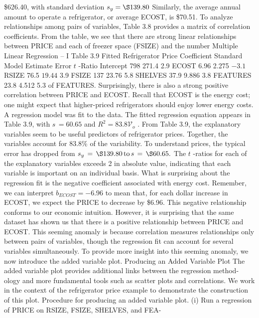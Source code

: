 \documentclass[11pt]{article}
\begin{document}
\$626.40, with standard deviation \(s_{y}=\S1 3 9 . 8 0\) Similarly, the average annual
amount to operate a refrigerator, or average ECOST, is \$70.51.
 To analyze relationships among pairs of variables, Table 3.8 provides a matrix
of correlation coefficients. From the table, we see that there are strong linear
relationships between PRICE and each of freezer space (FSIZE) and the number
 Multiple Linear Regression -- I
Table 3.9 Fitted
Refrigerator Price Coefficient Standard
 Model Estimate Error \(t\) -Ratio
Intercept 798 271.4 2.9
ECOST 6.96 2.275 \(- 3 . 1\)
RSIZE 76.5 \(1 9 . 4 4\) 3.9
FSIZE 137 23.76 5.8
SHELVES 37.9 9.886 3.8
FEATURES 23.8 4.512 5.3
 of FEATURES. Surprisingly, there is also a strong positive correlation between
PRICE and ECOST. Recall that ECOST is the energy cost; one might expect that 
 higher-priced refrigerators should enjoy lower energy costs.
 A regression model was fit to the data. The fitted regression equation appears
 in Table 3.9, with \(s \,=6 0 . 6 5\) and \(R^{2}=8 3 . 8 \mathcal{V}_{o}\) .
From Table 3.9, the explanatory variables seem to be useful predictors of
refrigerator prices. Together, the variables account for 83.8\% of the variability. To
 understand prices, the typical error has dropped from \(s_{y} \,=\, \S1 3 9 . 8 0 \, \mathrm{t o} \, s \,=\, \S6 0 . 6 5 .\)
The \(t\) -ratios for each of the explanatory variables exceeds 2 in absolute value,
 indicating that each variable is important on an individual basis.
What is surprising about the regression fit is the negative coefficient associated
with energy cost. Remember, we can interpret \(b_{E C O S T}=-6 . 9 6\) to mean that, for
each dollar increase in ECOST, we expect the PRICE to decrease by \$6.96. This
 negative relationship conforms to our economic intuition. However, it is surprising
that the same dataset has shown us that there is a positive relationship between
PRICE and ECOST. This seeming anomaly is because correlation measures
relationships only between pairs of variables, though the regression fit can account
for several variables simultaneously. To provide more insight into this seeming
 anomaly, we now introduce the added variable plot.
 Producing an Added Variable Plot
 The added variable plot provides additional links between the regression method-
 ology and more fundamental tools such as scatter plots and correlations. We work
 in the context of the refrigerator price example to demonstrate the construction
of this plot.
Procedure for producing an added variable plot.
(i) Run a regression of PRICE on RSIZE, FSIZE, SHELVES, and FEA-
\end{document}

